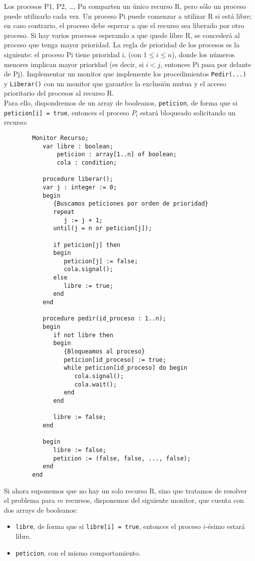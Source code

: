 \begin{ejercicio}
    Los procesos P1, P2, \ldots, Pn comparten un único recurso R, pero sólo un proceso puede utilizarlo cada vez. Un proceso Pi puede comenzar a utilizar R si está libre; en caso contrario, el proceso debe esperar a que el recurso sea liberado por otro proceso. Si hay varios procesos esperando a que quede libre R, se concederá al proceso que tenga mayor prioridad. La regla de prioridad de los procesos es la siguiente: el proceso Pi tiene prioridad i, (con $1 \leq i \leq n$), donde los números menores implican mayor prioridad (es decir, si $i < j$, entonces Pi pasa por delante de Pj). Implementar un monitor que implemente los procedimientos \verb|Pedir(...)| y \verb|Liberar()| con un monitor que garantice la exclusión mutua y el acceso prioritario del procesos al recurso R.\\

    Para ello, dispondremos de un array de booleanos, \verb|peticion|, de forma que si \verb|peticion[i] = true|, entonces el proceso $P_i$ estará bloqueado solicitando un recurso:
    \begin{verbatim}
        Monitor Recurso;
           var libre : boolean;
               peticion : array[1..n] of boolean;
               cola : condition;

           procedure liberar();
           var j : integer := 0;
           begin
              {Buscamos peticiones por orden de prioridad}
              repeat
                 j := j + 1;
              until(j = n or peticion[j]);

              if peticion[j] then
              begin
                 peticion[j] := false;
                 cola.signal();
              else
                 libre := true;
              end
           end

           procedure pedir(id_proceso : 1..n);
           begin
              if not libre then
              begin
                 {Bloqueamos al proceso}
                 peticion[id_proceso] := true;
                 while peticion[id_proceso] do begin
                    cola.signal();
                    cola.wait();
                 end
              end

              libre := false;
           end

           begin
              libre := false;
              peticion := (false, false, ..., false);
           end
        end
    \end{verbatim}
    Si ahora suponemos que no hay un solo recurso R, sino que tratamos de resolver el problema para $m$ recursos, disponemos del siguiente monitor, que cuenta con dos arrays de booleanos:
    \begin{itemize}
        \item \verb|libre|, de forma que si \verb|libre[i] = true|, entonces el proceso $i$-ésimo estará libre.
        \item \verb|peticion|, con el mismo comportamiento.
    \end{itemize}


\end{ejercicio}
